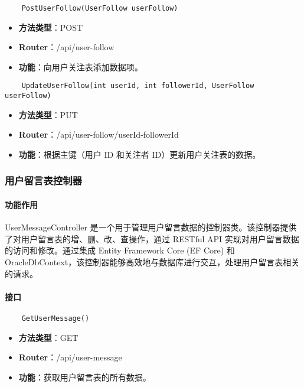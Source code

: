 \begin{verbatim}
	PostUserFollow(UserFollow userFollow)
\end{verbatim}

\begin{itemize}
	\item \textbf{方法类型}：POST
	\item \textbf{Router}：/api/user-follow
	\item \textbf{功能}：向用户关注表添加数据项。
\end{itemize}

\begin{verbatim}
	UpdateUserFollow(int userId, int followerId, UserFollow userFollow)
\end{verbatim}

\begin{itemize}
	\item \textbf{方法类型}：PUT
	\item \textbf{Router}：/api/user-follow/{userId}-{followerId}
	\item \textbf{功能}：根据主键（用户 ID 和关注者 ID）更新用户关注表的数据。
\end{itemize}

\subsubsection{用户留言表控制器}

\paragraph{功能作用}

UserMessageController 是一个用于管理用户留言数据的控制器类。该控制器提供了对用户留言表的增、删、改、查操作，通过 RESTful API 实现对用户留言数据的访问和修改。通过集成 Entity Framework Core (EF Core) 和 OracleDbContext，该控制器能够高效地与数据库进行交互，处理用户留言表相关的请求。

\paragraph{接口}

\begin{verbatim}
	GetUserMessage()
\end{verbatim}

\begin{itemize}
	\item \textbf{方法类型}：GET
	\item \textbf{Router}：/api/user-message
	\item \textbf{功能}：获取用户留言表的所有数据。
\end{itemize}

